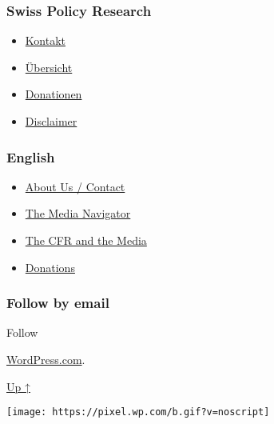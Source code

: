 \hypertarget{swiss-policy-research}{%
\subsubsection{Swiss Policy Research}\label{swiss-policy-research}}

\begin{itemize}
\tightlist
\item
  \href{https://swprs.org/kontakt/}{Kontakt}
\item
  \href{https://swprs.org/uebersicht/}{Übersicht}
\item
  \href{https://swprs.org/donationen/}{Donationen}
\item
  \href{https://swprs.org/disclaimer/}{Disclaimer}
\end{itemize}

\hypertarget{english}{%
\subsubsection{English}\label{english}}

\begin{itemize}
\tightlist
\item
  \href{https://swprs.org/contact/}{About Us / Contact}
\item
  \href{https://swprs.org/media-navigator/}{The Media Navigator}
\item
  \href{https://swprs.org/the-american-empire-and-its-media/}{The CFR
  and the Media}
\item
  \href{https://swprs.org/donations/}{Donations}
\end{itemize}

\hypertarget{follow-by-email}{%
\subsubsection{Follow by email}\label{follow-by-email}}

Follow

\href{https://wordpress.com/?ref=footer_custom_com}{WordPress.com}.

\protect\hyperlink{}{Up ↑}

\texttt{[image: https://pixel.wp.com/b.gif?v=noscript]}
